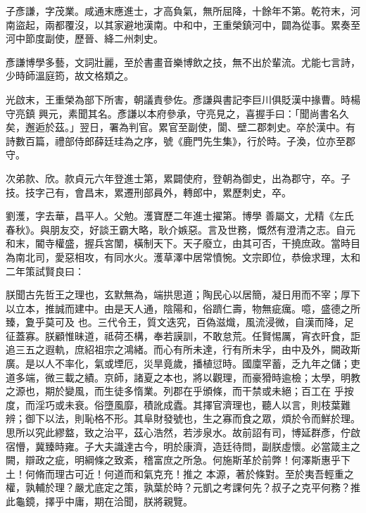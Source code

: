 \begin{pinyinscope}
 子彥謙，字茂業。咸通末應進士，才高負氣，無所屈降，十餘年不第。乾符末，河南盜起，兩都覆沒，以其家避地漢南。中和中，王重榮鎮河中，闢為從事。累奏至河中節度副使，歷晉、絳二州刺史。



 彥謙博學多藝，文詞壯麗，至於書畫音樂博飲之技，無不出於輩流。尤能七言詩，少時師溫庭筠，故文格類之。



 光啟末，王重榮為部下所害，朝議責參佐。彥謙與書記李巨川俱貶漢中掾曹。時楊守亮鎮
 興元，素聞其名。彥謙以本府參承，守亮見之，喜握手曰：「聞尚書名久矣，邂逅於茲。」翌日，署為判官。累官至副使，閬、壁二郡刺史。卒於漢中。有詩數百篇，禮部侍郎薛廷珪為之序，號《鹿門先生集》，行於時。子渙，位亦至郡守。



 次弟款、欣。款貞元六年登進士第，累闢使府，登朝為御史，出為郡守，卒。子技。技字己有，會昌末，累遷刑部員外，轉郎中，累歷刺史，卒。



 劉濩，字去華，昌平人。父勉。濩寶歷二年進士擢第。博學
 善屬文，尤精《左氏春秋》。與朋友交，好談王霸大略，耿介嫉惡。言及世務，慨然有澄清之志。自元和末，閽寺權盛，握兵宮闈，橫制天下。天子廢立，由其可否，干撓庶政。當時目為南北司，愛惡相攻，有同水火。濩草澤中居常憤惋。文宗即位，恭儉求理，太和二年策試賢良曰：



 朕聞古先哲王之理也，玄默無為，端拱思道；陶民心以居簡，凝日用而不宰；厚下以立本，推誠而建中。由是天人通，陰陽和，俗躋仁壽，物無疵癘。噫，盛德之所臻，夐乎莫可及
 也。三代令王，質文迭究，百偽滋熾，風流浸微，自漢而降，足征蓋寡。朕顧惟昧道，祗荷丕構，奉若謨訓，不敢怠荒。任賢惕厲，宵衣旰食，詎追三五之遐軌，庶紹祖宗之鴻緒。而心有所未達，行有所未孚，由中及外，闕政斯廣。是以人不率化，氣或堙厄，災旱竟歲，播植愆時。國廩罕蓄，乏九年之儲；吏道多端，微三載之績。京師，諸夏之本也，將以觀理，而豪猾時逾檢；太學，明教之源也，期於變風，而生徒多惰業。列郡在乎頒條，而干禁或未絕；百工在
 乎按度，而淫巧或未衰。俗墮風靡，積訛成蠹。其擇官濟理也，聽人以言，則枝葉難辨；御下以法，則恥格不形。其阜財發號也，生之寡而食之眾，煩於令而鮮於理。思所以究此繆盩，致之治平，茲心浩然，若涉泉水。故前詔有司，博延群彥，佇啟宿懵，冀臻時雍。子大夫識達古今，明於康濟，造廷待問，副朕虛懷。必當箴主之闕，辯政之疵，明綱條之致紊，稽富庶之所急。何施斯革於前弊！何澤斯惠乎下土！何脩而理古可近！何道而和氣克充！推之
 本源，著於條對。至於夷吾輕重之權，孰輔於理？嚴尤底定之策，孰葉於時？元凱之考課何先？叔子之克平何務？推此龜鏡，擇乎中庸，期在洽聞，朕將親覽。




\end{pinyinscope}

